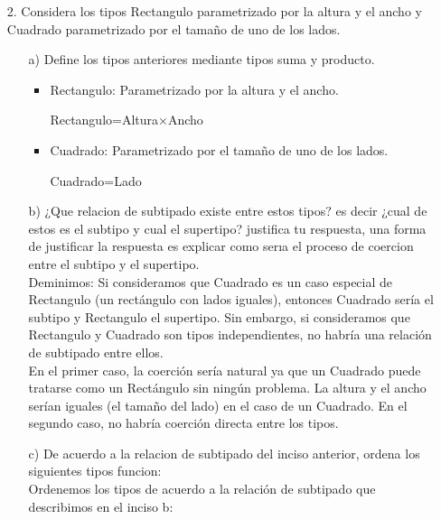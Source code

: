 \documentclass{article}
\begin{document}
    \begin{itemize}
        \item[2.] Considera los tipos Rectangulo parametrizado por la altura y el ancho y Cuadrado parametrizado por el tamaño de uno de los lados.

        \begin{itemize}
            \item[a)] Define los tipos anteriores mediante tipos suma y producto.\\
            
            \begin{itemize}
                \item Rectangulo: Parametrizado por la altura y el ancho.
                \item[ ] Rectangulo=Altura×Ancho
                \item Cuadrado: Parametrizado por el tamaño de uno de los lados.
                \item[ ] Cuadrado=Lado
            \end{itemize}



            \item[b)] ¿Que relacion de subtipado existe entre estos tipos? es decir ¿cual de estos es el subtipo y cual el supertipo? justifica tu respuesta, una forma de justificar la respuesta es explicar como serıa el proceso de coercion entre el subtipo y el supertipo.\\

            Deminimos: Si consideramos que Cuadrado es un caso especial de Rectangulo (un rectángulo con lados iguales), entonces Cuadrado sería el subtipo y Rectangulo el supertipo. Sin embargo, si consideramos que Rectangulo y Cuadrado son tipos independientes, no habría una relación de subtipado entre ellos.\\

            En el primer caso, la coerción sería natural ya que un Cuadrado puede tratarse como un Rectángulo sin ningún problema. La altura y el ancho serían iguales (el tamaño del lado) en el caso de un Cuadrado. En el segundo caso, no habría coerción directa entre los tipos.

            \item[c)] De acuerdo a la relacion de subtipado del inciso anterior, ordena los siguientes tipos funcion:\\
            Ordenemos los tipos de acuerdo a la relación de subtipado que describimos en el inciso b:


\end{itemize}
\end{itemize}
\end{document}

